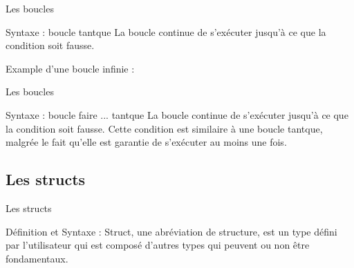 \documentclass{beamer}
\begin{document}
\begin{darkframes}


	\begin{frame}{Les boucles}
		\begin{block}{Syntaxe : boucle tantque}
			\WhileSyntax
			La boucle continue de s'exécuter jusqu'à ce que la condition soit \alert{fausse}.
		\end{block}
		\begin{exampleblock}{Example d'une boucle infinie :}
			\WhileInfinite
		\end{exampleblock}
	\end{frame}

	\begin{frame}{Les boucles}
		\begin{block}{Syntaxe : boucle faire ... tantque}
			\doWhileSyntax
			La boucle continue de s'exécuter jusqu'à ce que la condition soit \alert{fausse}. 
			Cette condition est similaire à une boucle tantque, malgrée le fait qu'elle est garantie de s'exécuter au moins une fois.
		\end{block}
	\end{frame}
	


  	\subsection{Les structs}
  	\begin{frame}{Les structs}
  		\begin{block}{Définition et Syntaxe :}
  			Struct, une abréviation de structure, est un type défini par l'utilisateur qui est composé d'autres types qui peuvent ou non être fondamentaux.
  			\structSyntax
  		\end{block}
  	\end{frame}
  

\end{darkframes}
\end{document}
